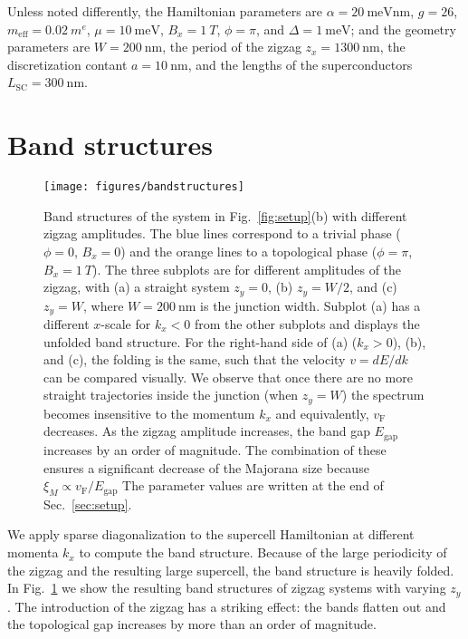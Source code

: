 \documentclass[english, twocolumn, 10pt, aps, superscriptaddress, floatfix, prb, citeautoscript]{revtex4-1}
\newcommand{\meff}{m_\text{eff}}
\renewcommand{\comment}[2]{#2}
\begin{document}
\comment{The default parameters are ...}
Unless noted differently, the Hamiltonian parameters are $\alpha=\SI{20}{\meV \nm}$, $g=26$, $\meff=\SI{0.02}{\electronmass}$, $\mu=\SI{10}{\meV}$, $B_x=\SI{1}{T}$, $\phi=\pi$, and $\Delta=\SI{1}{\meV}$; and the geometry parameters are $W=\SI{200}{\nm}$, the period of the zigzag $z_x=\SI{1300}{\nm}$, the discretization contant $a=\SI{10}{\nm}$, and the lengths of the superconductors $L_\textrm{SC}=\SI{300}{\nm}$.


\section{Band structures}\label{sec:band_structures}

\begin{figure}[!htb]
\texttt{[image: figures/bandstructures]}
\caption{Band structures of the system in Fig.~\ref{fig:setup}(b) with different zigzag amplitudes.
The blue lines correspond to a trivial phase ($\phi=0$, $B_x = 0$) and the orange lines to a topological phase ($\phi=\pi$, $B_x = \SI{1}{T}$).
The three subplots are for different amplitudes of the zigzag, with (a) a straight system $z_y=0$, (b) $z_y=W/2$, and (c) $z_y=W$, where $W=\SI{200}{\nm}$ is the junction width.
Subplot (a) has a different $x$-scale for $k_x < 0$ from the other subplots and displays the unfolded band structure.
For the right-hand side of (a) ($k_x > 0$), (b), and (c), the folding is the same, such that the velocity $v=dE/dk$ can be compared visually.
We observe that once there are no more straight trajectories inside the junction (when $z_y=W$) the spectrum becomes insensitive to the momentum $k_x$ and equivalently, $v_\textrm{F}$ decreases.
As the zigzag amplitude increases, the band gap $E_\textrm{gap}$ increases by an order of magnitude.
The combination of these ensures a significant decrease of the Majorana size because $\xi_M \propto v_\textrm{F}/E_\textrm{gap}$
The parameter values are written at the end of Sec.~\ref{sec:setup}.\label{fig:band_structures}}
\end{figure}

\comment{We calculate the band structure for varying amount of zigzag.}
We apply sparse diagonalization to the supercell Hamiltonian at different momenta $k_x$ to compute the band structure.
Because of the large periodicity of the zigzag and the resulting large supercell, the band structure is heavily folded.
In Fig.~\ref{fig:band_structures} we show the resulting band structures of zigzag systems with varying $z_y$.
The introduction of the zigzag has a striking effect: the bands flatten out and the topological gap increases by more than an order of magnitude.
\end{document}
